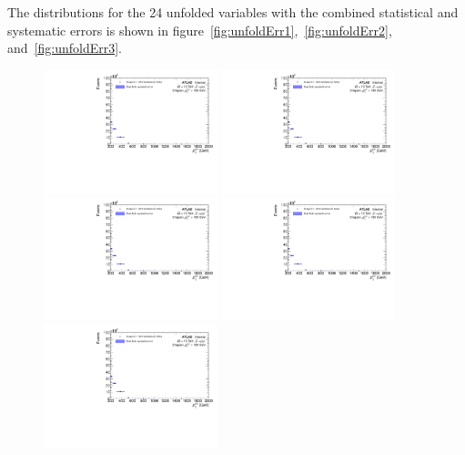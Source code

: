 The distributions for the 24 unfolded variables with the combined statistical and systematic errors is shown in figure~\ref{fig:unfoldErr1},~\ref{fig:unfoldErr2}, and~\ref{fig:unfoldErr3}.

\begin{figure}[h!]
  \centering
  \includegraphics[page=28,width=0.45\textwidth]{figures/unfoldErrPlots.pdf}
  \includegraphics[page=56,width=0.45\textwidth]{figures/unfoldErrPlots.pdf} \\
  \includegraphics[page=112,width=0.45\textwidth]{figures/unfoldErrPlots.pdf}
  \includegraphics[page=140,width=0.45\textwidth]{figures/unfoldErrPlots.pdf} \\
  \includegraphics[page=164,width=0.45\textwidth]{figures/unfoldErrPlots.pdf}

\end{figure}
